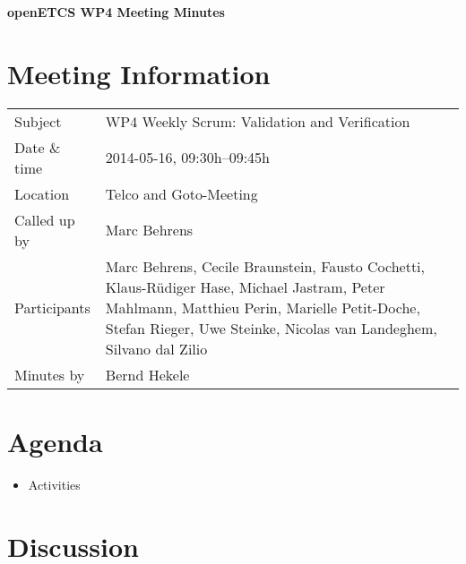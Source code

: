 \documentclass[a4paper, 11pt]{article}
\begin{document}
{\begin{center}\huge\bf openETCS WP4 Meeting Minutes\end{center}}
\section{Meeting Information}

\renewcommand{\arraystretch}{1.5}
\begin{supertabular}{m{.2\textwidth}m{.8\textwidth}}
Subject & WP4 Weekly Scrum: Validation and Verification\\
Date \& time & 2014-05-16, 09:30h--09:45h\\
Location & Telco and Goto-Meeting\\
Called up by & Marc Behrens\\
Participants &
Marc Behrens,
Cecile Braunstein,
Fausto Cochetti,
Klaus-R\"udiger Hase,
Michael Jastram,
Peter Mahlmann,
Matthieu Perin,
Marielle Petit-Doche,
Stefan Rieger,
Uwe Steinke,
Nicolas van Landeghem,
Silvano dal Zilio
\\

Minutes by & Bernd Hekele\\

\end{supertabular}
\renewcommand{\arraystretch}{1.0}


\section{{Agenda}}
\begin{itemize}
\item Activities
\end{itemize}

\section{Discussion}
\end{document}

